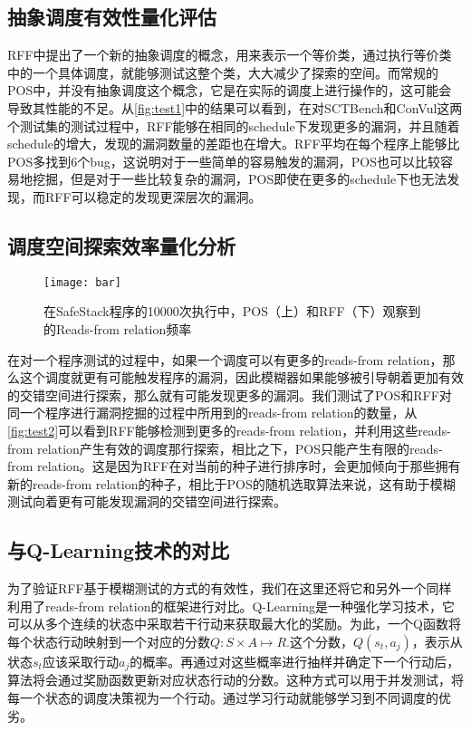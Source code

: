 \subsection{抽象调度有效性量化评估}

RFF中提出了一个新的抽象调度的概念，用来表示一个等价类，通过执行等价类中的一个具体调度，就能够测试这整个类，大大减少了探索的空间。而常规的POS中，并没有抽象调度这个概念，它是在实际的调度上进行操作的，这可能会导致其性能的不足。从\autoref{fig:test1}中的结果可以看到，在对SCTBench和ConVul这两个测试集的测试过程中，RFF能够在相同的schedule下发现更多的漏洞，并且随着schedule的增大，发现的漏洞数量的差距也在增大。RFF平均在每个程序上能够比POS多找到6个bug，这说明对于一些简单的容易触发的漏洞，POS也可以比较容易地挖掘，但是对于一些比较复杂的漏洞，POS即使在更多的schedule下也无法发现，而RFF可以稳定的发现更深层次的漏洞。

\subsection{调度空间探索效率量化分析}

\begin{figure}[ht]
    \centering
    \texttt{[image: bar]}
    \caption{\label{fig:test2}在SafeStack程序的10000次执行中，POS（上）和RFF（下）观察到的Reads-from relation频率}
\end{figure}

在对一个程序测试的过程中，如果一个调度可以有更多的reads-from relation，那么这个调度就更有可能触发程序的漏洞，因此模糊器如果能够被引导朝着更加有效的交错空间进行探索，那么就有可能发现更多的漏洞。我们测试了POS和RFF对同一个程序进行漏洞挖掘的过程中所用到的reads-from relation的数量，从\autoref{fig:test2}可以看到RFF能够检测到更多的reads-from relation，并利用这些reads-from relation产生有效的调度那行探索，相比之下，POS只能产生有限的reads-from relation。这是因为RFF在对当前的种子进行排序时，会更加倾向于那些拥有新的reads-from relation的种子，相比于POS的随机选取算法来说，这有助于模糊测试向着更有可能发现漏洞的交错空间进行探索。

\subsection{与Q-Learning技术的对比}
为了验证RFF基于模糊测试的方式的有效性，我们在这里还将它和另外一个同样利用了reads-from relation的框架进行对比。Q-Learning是一种强化学习技术，它可以从多个连续的状态中采取若干行动来获取最大化的奖励。为此，一个Q函数将每个状态行动映射到一个对应的分数$Q:S\times A \mapsto R$.这个分数，$Q(s_t, a_j)$，表示从状态$s_t$应该采取行动$a_j$的概率。再通过对这些概率进行抽样并确定下一个行动后，算法将会通过奖励函数更新对应状态行动的分数。这种方式可以用于并发测试，将每一个状态的调度决策视为一个行动。通过学习行动就能够学习到不同调度的优劣。


